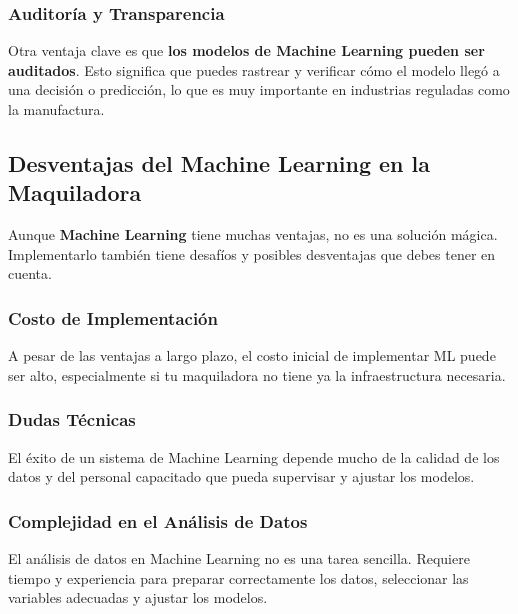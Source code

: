 \subsubsection{\textbf{Auditoría y Transparencia}}\label{auditoria-y-transparencia}

Otra ventaja clave es que \textbf{los modelos de Machine Learning pueden ser auditados}. Esto significa que puedes rastrear y verificar cómo el modelo llegó a una decisión o predicción, lo que es muy importante en industrias reguladas como la manufactura.

\subsection{\textbf{Desventajas del Machine Learning en la Maquiladora}}\label{desventajas-del-machine-learning-en-la-maquiladora}

Aunque \textbf{Machine Learning} tiene muchas ventajas, no es una solución mágica. Implementarlo también tiene desafíos y posibles desventajas que debes tener en cuenta.

\subsubsection{\textbf{Costo de Implementación}}\label{costo-de-implementacion}

A pesar de las ventajas a largo plazo, el costo inicial de implementar ML puede ser alto, especialmente si tu maquiladora no tiene ya la infraestructura necesaria.

\subsubsection{\textbf{Dudas Técnicas}}\label{dudas-tecnicas}

El éxito de un sistema de Machine Learning depende mucho de la calidad de los datos y del personal capacitado que pueda supervisar y ajustar los modelos.

\subsubsection{\textbf{Complejidad en el Análisis de Datos}}\label{complejidad-en-el-analisis-de-datos}

El análisis de datos en Machine Learning no es una tarea sencilla. Requiere tiempo y experiencia para preparar correctamente los datos, seleccionar las variables adecuadas y ajustar los modelos.

